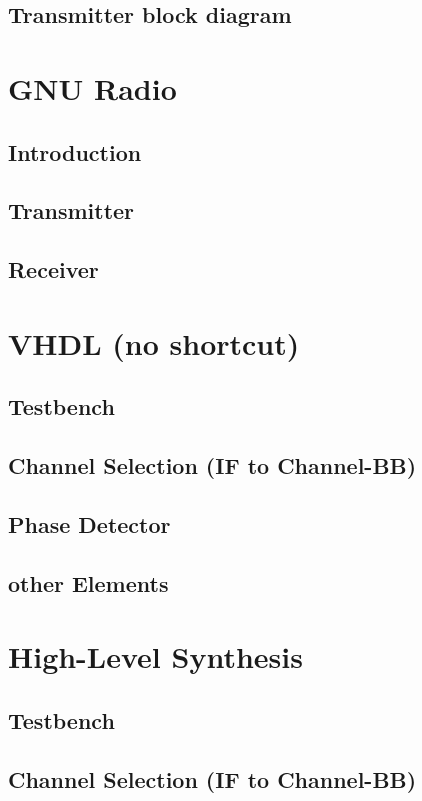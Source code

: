 \subsection{Transmitter block diagram}

\section{GNU Radio}
  \subsection{Introduction}
  \subsection{Transmitter}
  \subsection{Receiver}

\section{VHDL (no shortcut)}
  \subsection{Testbench}
  \subsection{Channel Selection (IF to Channel-BB)}
  \subsection{Phase Detector}
  \subsection{other Elements}

  \section{High-Level Synthesis}
  \subsection{Testbench}
  \subsection{Channel Selection (IF to Channel-BB)}
